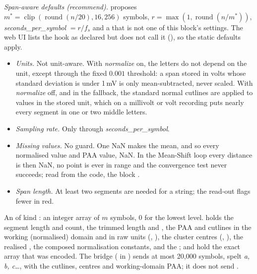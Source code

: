 \emph{Span-aware defaults (recommend).}  proposes
$m^\ast = \operatorname{clip}(\operatorname{round}(n/20), 16, 256)$ symbols,
$r = \max(1, \operatorname{round}(n/m^\ast))$, \emph{seconds\_per\_symbol} $= r/f_s$ and a
 that is not one of this block's settings. The web UI lists the
hook as declared but does not call it (), so the
static defaults apply.

\begin{itemize}
\item \emph{Units.} Not unit-aware. With \emph{normalize} on, the letters do not depend on
  the unit, except through the fixed $0.001$ threshold: a span stored in volts whose
  standard deviation is under 1\,mV is only mean-subtracted, never scaled. With
  \emph{normalize} off, and in the fallback, the standard normal cutlines are applied to
  values in the stored unit, which on a millivolt or volt recording puts nearly every
  segment in one or two middle letters.
\item \emph{Sampling rate.} Only through \emph{seconds\_per\_symbol}.
\item \emph{Missing values.} No guard. One NaN makes the mean, and so every normalised value
  and PAA value, NaN. In the Mean-Shift loop every distance is then NaN, no point is ever in
  range and the convergence test never succeeds; read from the code, the block
  .
\item \emph{Span length.} At least two segments are needed for a string; the read-out flags
  fewer in red.
\end{itemize}

An  of kind : an integer array of $m$ symbols, 0 for the
lowest level.  holds the segment length and count, the trimmed length
and , the PAA and cutlines in the working (normalised) domain and in raw
units (, ), the cluster centres
(, ), the realised ,
the composed normalisation constants,  and the ;
 and  hold the exact array that was encoded.
The bridge ( in ) sends at most 20{,}000
symbols, spelt \emph{a, b, c}\ldots, with the cutlines, centres and working-domain PAA; it
does not send .

